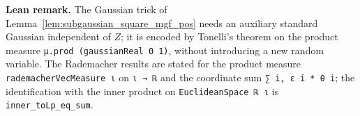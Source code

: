 \textbf{Lean remark.} The Gaussian trick of Lemma~\ref{lem:subgaussian_square_mgf_pos} needs an
auxiliary standard Gaussian independent of $Z$; it is encoded by Tonelli's theorem on the
product measure \texttt{μ.prod (gaussianReal 0 1)}, without introducing a new random variable.
The Rademacher results are stated for the product measure \texttt{rademacherVecMeasure ι} on
\texttt{ι → ℝ} and the coordinate sum \texttt{∑ i, ε i * θ i}; the identification with the
inner product on \texttt{EuclideanSpace ℝ ι} is \texttt{inner\_toLp\_eq\_sum}.
